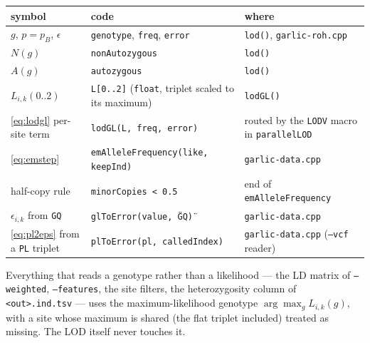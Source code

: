 \documentclass[11pt]{article}
\newcommand{\code}[1]{\texttt{#1}}
\begin{document}
\begin{center}
\begin{tabular}{@{}>{\raggedright\arraybackslash}p{}>{\raggedright\arraybackslash}p{}>{\raggedright\arraybackslash}p{}@{}}
\toprule
symbol & code & where \\
\midrule
$g$, $p = p_B$, $\epsilon$ & \code{genotype}, \code{freq}, \code{error} & \code{lod()}, \code{garlic-roh.cpp} \\
$N(g)$ & \code{nonAutozygous} & \code{lod()} \\
$A(g)$ & \code{autozygous} & \code{lod()} \\
$L_{i,k}(0..2)$ & \code{L[0..2]} (\code{float}, triplet scaled to its maximum) & \code{lodGL()} \\
\eqref{eq:lodgl} per-site term & \code{lodGL(L, freq, error)} & routed by the \code{LODV} macro in \code{parallelLOD} \\
\eqref{eq:emstep} & \code{emAlleleFrequency(like, keepInd)} & \code{garlic-data.cpp} \\
half-copy rule & \code{minorCopies < 0.5} & end of \code{emAlleleFrequency} \\
$\epsilon_{i,k}$ from \code{GQ} & \code{glToError(value, \"GQ\")} & \code{garlic-data.cpp} \\
\eqref{eq:pl2eps} from a \code{PL} triplet & \code{plToError(pl, calledIndex)} & \code{garlic-data.cpp} (\code{--vcf} reader) \\
\bottomrule
\end{tabular}
\end{center}

\noindent Everything that reads a genotype rather than a likelihood --- the LD matrix of \code{--weighted}, \code{--features}, the site filters, the heterozygosity column of \code{<out>.ind.tsv} --- uses the maximum-likelihood genotype $\arg\max_g L_{i,k}(g)$, with a site whose maximum is shared (the flat triplet included) treated as missing. The LOD itself never touches it.
\end{document}
